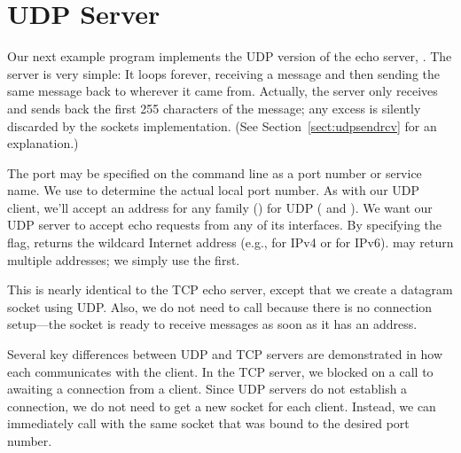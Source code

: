\section{UDP Server}

\noindent Our next example program implements the UDP version of the echo
server, .  The server is very simple: It loops forever,
receiving a message and then sending the same message back to wherever it came
from.  Actually, the server only receives and
sends back the first 255 characters of the message; any excess is
silently discarded by the sockets implementation.  (See
Section~\ref{sect:udpsendrcv} for an explanation.)


\begin{topcode}



The port may be specified on the command line as a port number or service name.
We use  to determine the actual local port
number.  As with our UDP client, we'll accept an address for any family
() for UDP ( and
).  We want our UDP server to
accept echo requests from any of its interfaces.  By
specifying the  flag,  returns
the wildcard Internet address (e.g.,  for IPv4 or
 for IPv6).   may return
multiple addresses; we simply use the first.


This is nearly identical to the TCP echo server, except that we
create a datagram socket using UDP.  Also, we do not need to
call
 because there is no connection setup---the
socket is ready to receive messages as soon as it has an address.


Several key differences between UDP and TCP servers are demonstrated
in how each communicates with the client.  In the TCP server, we
blocked on a call to  awaiting a connection
from a client.  Since UDP servers do not establish a
connection, we do not need to get a new socket for each client.
Instead, we can immediately call 
with the same socket that was bound to
the desired port number.


\end{topcode}
